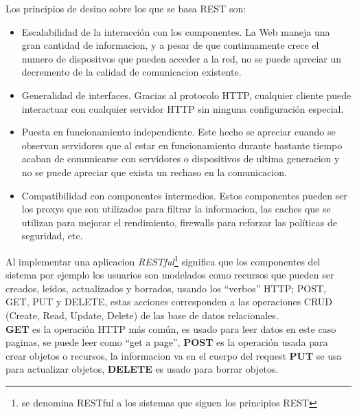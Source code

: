 Los principios de desino sobre los que se basa REST son:
\begin{itemize}
  \item Escalabilidad de la interacción con los componentes. La Web maneja una gran cantidad de informacion, y a pesar de que continuamente crece el numero de dispositvos que pueden acceder a la red, no se puede apreciar un decremento de la calidad de comunicacion existente.

  \item Generalidad de interfaces. Gracias al protocolo HTTP, cualquier cliente puede interactuar con cualquier servidor HTTP sin ninguna configuración especial.

  \item Puesta en funcionamiento independiente. Este hecho se apreciar cuando se observan servidores que al estar en funcionamiento durante bastante tiempo acaban de comunicarse con servidores o dispositivos de ultima generacion y no se puede apreciar que exista un rechaso en la comunicacion.

  \item Compatibilidad con componentes intermedios. Estos componentes pueden ser los proxys que son utilizados para filtrar la informacion, las caches que se utilizan para mejorar el rendimiento, firewalls para reforzar las políticas de seguridad, etc. \cite{rest_web_service}

\end{itemize}

 Al implementar una aplicacion \emph{RESTful}\footnote{se denomina RESTful a los sistemas que siguen los principios REST} significa que los componentes del sistema por ejemplo los usuarios son modelados como recursos que pueden ser creados, leídos, actualizados y borrados, usando los ``verbos'' HTTP; POST, GET, PUT y DELETE, estas acciones corresponden a las operaciones CRUD (Create, Read, Update, Delete) de las base de datos relacionales.\\



\textbf{GET} es la operación HTTP más común, es usado para leer
datos en este caso paginas, se puede leer como ``get a page'',
\textbf{POST} es la operación usada para crear objetos o recursos, la informacion va en el cuerpo del request
\textbf{PUT} se usa para actualizar objetos,
\textbf{DELETE} es usado para borrar objetos. \\

